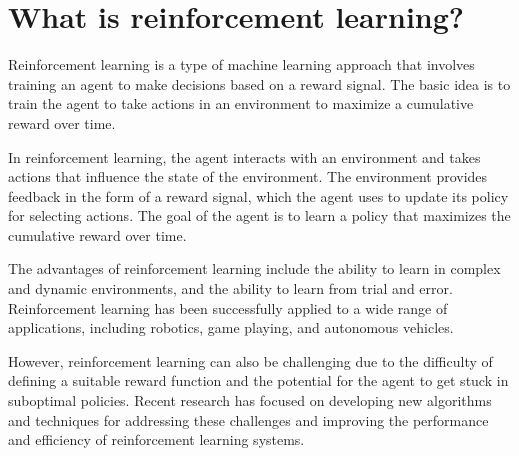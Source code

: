 \section{What is reinforcement learning?}
Reinforcement learning is a type of machine learning approach that involves training an agent to make decisions based on a reward signal. The basic idea is to train the agent to take actions in an environment to maximize a cumulative reward over time.

In reinforcement learning, the agent interacts with an environment and takes actions that influence the state of the environment. The environment provides feedback in the form of a reward signal, which the agent uses to update its policy for selecting actions. The goal of the agent is to learn a policy that maximizes the cumulative reward over time.

The advantages of reinforcement learning include the ability to learn in complex and dynamic environments, and the ability to learn from trial and error. Reinforcement learning has been successfully applied to a wide range of applications, including robotics, game playing, and autonomous vehicles.

However, reinforcement learning can also be challenging due to the difficulty of defining a suitable reward function and the potential for the agent to get stuck in suboptimal policies. Recent research has focused on developing new algorithms and techniques for addressing these challenges and improving the performance and efficiency of reinforcement learning systems.

